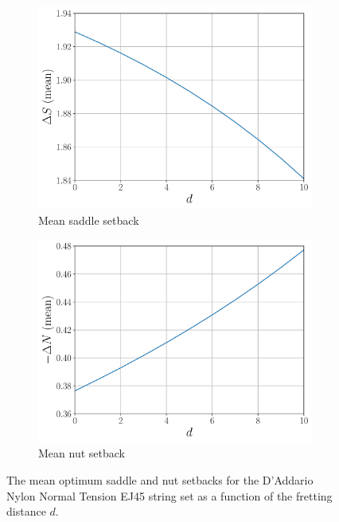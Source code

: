 \begin{figure}
  \centering
  \begin{subfigure}[b]{0.8\textwidth}
      \centering
      \includegraphics[width=5.0in]{../figures/dsd_ej45}
      \caption{Mean saddle setback}
      \label{fig:dsd_ej45}
  \end{subfigure}
  \par\vspace{0.25in}
  \begin{subfigure}[b]{0.8\textwidth}
      \centering
      \includegraphics[width=5.0in]{../figures/dnd_ej45}
      \caption{Mean nut setback}
      \label{fig:dnd_ej45}
  \end{subfigure}
  \caption{\label{fig:dsdnd_ej45} The mean optimum saddle and nut setbacks for the D'Addario Nylon Normal Tension EJ45 string set as a function of the fretting distance $d$.}
\end{figure}

